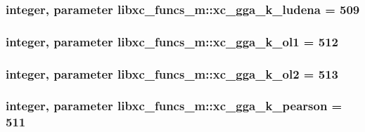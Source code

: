 \hypertarget{classlibxc__funcs__m_a6475c093454c530ad518fa7e3a510a62}{
\subsubsection[{xc\-\_\-gga\-\_\-k\-\_\-ludena}]{\setlength{\rightskip}{0pt plus 5cm}integer, parameter libxc\-\_\-funcs\-\_\-m\-::xc\-\_\-gga\-\_\-k\-\_\-ludena = 509}}\label{classlibxc__funcs__m_a6475c093454c530ad518fa7e3a510a62}
\hypertarget{classlibxc__funcs__m_ab247fe1f01d85242ef5d736e1eac910f}{
\subsubsection[{xc\-\_\-gga\-\_\-k\-\_\-ol1}]{\setlength{\rightskip}{0pt plus 5cm}integer, parameter libxc\-\_\-funcs\-\_\-m\-::xc\-\_\-gga\-\_\-k\-\_\-ol1 = 512}}\label{classlibxc__funcs__m_ab247fe1f01d85242ef5d736e1eac910f}
\hypertarget{classlibxc__funcs__m_a665be38eab97cb94427b1067b053be43}{
\subsubsection[{xc\-\_\-gga\-\_\-k\-\_\-ol2}]{\setlength{\rightskip}{0pt plus 5cm}integer, parameter libxc\-\_\-funcs\-\_\-m\-::xc\-\_\-gga\-\_\-k\-\_\-ol2 = 513}}\label{classlibxc__funcs__m_a665be38eab97cb94427b1067b053be43}
\hypertarget{classlibxc__funcs__m_a94d94678ce6e81922ea114df3ef172b6}{
\subsubsection[{xc\-\_\-gga\-\_\-k\-\_\-pearson}]{\setlength{\rightskip}{0pt plus 5cm}integer, parameter libxc\-\_\-funcs\-\_\-m\-::xc\-\_\-gga\-\_\-k\-\_\-pearson = 511}}\label{classlibxc__funcs__m_a94d94678ce6e81922ea114df3ef172b6}
